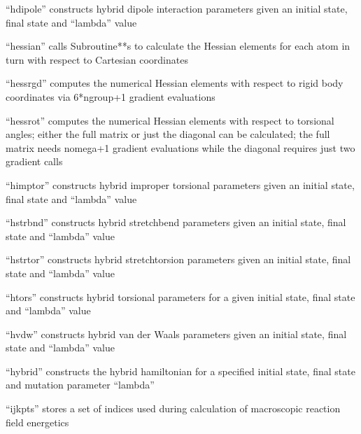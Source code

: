 \documentclass[letterpaper,11pt,english]{sphinxmanual}
\begin{document}

“hdipole” constructs hybrid dipole interaction parameters given an initial state, final state and “lambda” value


“hessian” calls Subroutine**s to calculate the Hessian elements for each atom in turn with respect to Cartesian coordinates


“hessrgd” computes the numerical Hessian elements with respect to rigid body coordinates via 6*ngroup+1 gradient evaluations


“hessrot” computes the numerical Hessian elements with respect to torsional angles; either the full matrix or just the diagonal can be calculated; the full matrix needs nomega+1 gradient evaluations while the diagonal requires just two gradient calls


“himptor” constructs hybrid improper torsional parameters given an initial state, final state and “lambda” value


“hstrbnd” constructs hybrid stretch\sphinxhyphen{}bend parameters given an initial state, final state and “lambda” value


“hstrtor” constructs hybrid stretch\sphinxhyphen{}torsion parameters given an initial state, final state and “lambda” value


“htors” constructs hybrid torsional parameters for a given initial state, final state and “lambda” value


“hvdw” constructs hybrid van der Waals  parameters given an initial state, final state and “lambda” value


“hybrid” constructs the hybrid hamiltonian for a specified initial state, final state and mutation parameter “lambda”


“ijkpts” stores a set of indices used during calculation of macroscopic reaction field energetics
\end{document}
